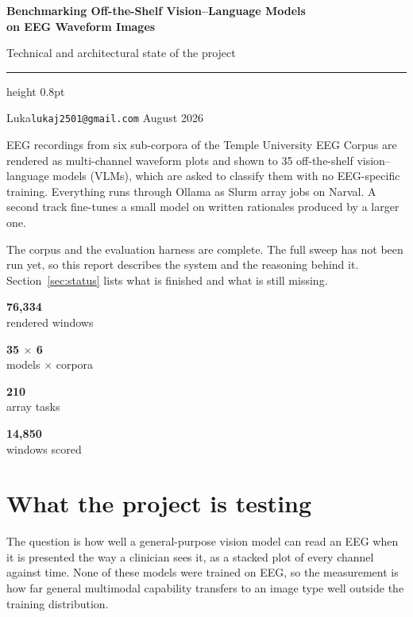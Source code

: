 \documentclass[11pt,a4paper]{article}
\newcommand{\tile}[2]{%
  \begin{minipage}[t]{0.24\linewidth}\centering
    {\large\sffamily\bfseries\color{accent}#1}\\[0.1em]
    {\scriptsize\sffamily\color{muted}#2}
  \end{minipage}}
\begin{document}
\thispagestyle{fancy}

\begingroup
\setlength{\parskip}{0pt}
{\LARGE\bfseries\color{accent}Benchmarking Off-the-Shelf Vision--Language Models\\[0.18em]
on EEG Waveform Images\par}
\vspace{0.55em}
{\large\sffamily\color{muted}Technical and architectural state of the project\par}
\vspace{0.7em}
{\color{rule}\hrule height 0.8pt}
\vspace{0.55em}
{\small\sffamily\color{muted}Luka\quad\textbullet\quad\texttt{lukaj2501@gmail.com}\quad\textbullet{} August 2026\par}
\endgroup
\vspace{1.1em}

\begin{summarybox}
EEG recordings from six sub-corpora of the Temple University EEG Corpus are
rendered as multi-channel waveform plots and shown to 35 off-the-shelf
vision--language models (VLMs), which are asked to classify them with no
EEG-specific training. Everything runs through Ollama as Slurm array jobs on
Narval. A second track fine-tunes a small model on written rationales produced by
a larger one.

\smallskip
The corpus and the evaluation harness are complete. The full sweep has not been
run yet, so this report describes the system and the reasoning behind it.
Section~\ref{sec:status} lists what is finished and what is still missing.
\end{summarybox}

\vspace{0.5em}
\noindent
\tile{76{,}334}{rendered windows}\hfill
\tile{35 $\times$ 6}{models $\times$ corpora}\hfill
\tile{210}{array tasks}\hfill
\tile{14{,}850}{windows scored}
\vspace{0.4em}

\section{What the project is testing}

The question is how well a general-purpose vision model can read an EEG when it
is presented the way a clinician sees it, as a stacked plot of every channel
against time. None of these models were trained on EEG, so the measurement is how
far general multimodal capability transfers to an image type well outside the
training distribution.
\end{document}
